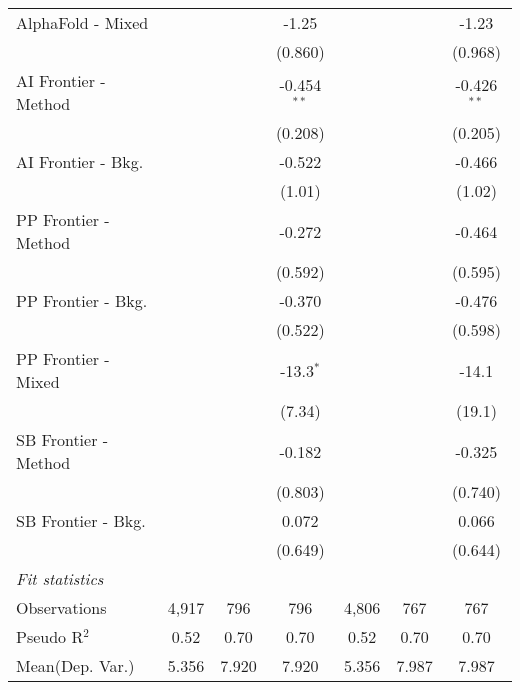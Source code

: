 \begin{tabular}{lcccccc}
   AlphaFold - Mixed    &               &              & -1.25         &               &              & -1.23\\   
                        &               &              & (0.860)       &               &              & (0.968)\\   
   AI Frontier - Method &               &              & -0.454$^{**}$ &               &              & -0.426$^{**}$\\   
                        &               &              & (0.208)       &               &              & (0.205)\\   
   AI Frontier - Bkg.   &               &              & -0.522        &               &              & -0.466\\   
                        &               &              & (1.01)        &               &              & (1.02)\\   
   PP Frontier - Method &               &              & -0.272        &               &              & -0.464\\   
                        &               &              & (0.592)       &               &              & (0.595)\\   
   PP Frontier - Bkg.   &               &              & -0.370        &               &              & -0.476\\   
                        &               &              & (0.522)       &               &              & (0.598)\\   
   PP Frontier - Mixed  &               &              & -13.3$^{*}$   &               &              & -14.1\\   
                        &               &              & (7.34)        &               &              & (19.1)\\   
   SB Frontier - Method &               &              & -0.182        &               &              & -0.325\\   
                        &               &              & (0.803)       &               &              & (0.740)\\   
   SB Frontier - Bkg.   &               &              & 0.072         &               &              & 0.066\\   
                        &               &              & (0.649)       &               &              & (0.644)\\   
   \midrule
   \emph{Fit statistics}\\
   Observations         & 4,917         & 796          & 796           & 4,806         & 767          & 767\\  
   Pseudo R$^2$         & 0.52          & 0.70         & 0.70          & 0.52          & 0.70         & 0.70\\  
Mean(Dep. Var.) & 5.356 & 7.920 & 7.920 & 5.356 & 7.987 & 7.987 \\
   

\end{tabular}
